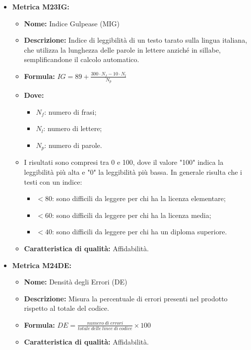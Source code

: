 \begin{itemize}
    \item \hypertarget{item:M23IG}{\textbf{Metrica M23IG:}}
    \begin{minipage}[t]{0.9\textwidth}
            \begin{itemize}
                \item \textbf{Nome:} Indice Gulpease (MIG)
                \item \textbf{Descrizione:} Indice di leggibilità di un testo tarato sulla lingua italiana, che utilizza la lunghezza delle parole in lettere anziché in sillabe, semplificandone il calcolo automatico.
                \item \textbf{Formula:} $IG = 89 + \frac{300 \cdot N_f - 10 \cdot N_l}{N_p}$
                \item \textbf{Dove:}
                      \begin{itemize}
                          \item $N_f$: numero di frasi;
                          \item $N_l$: numero di lettere;
                          \item $N_p$: numero di parole.
                      \end{itemize}
                \item I risultati sono compresi tra 0 e 100, dove il valore "100" indica la leggibilità più alta e "0" la leggibilità più bassa. In generale risulta che i testi con un indice:
                      \begin{itemize}
                          \item $< 80$: sono difficili da leggere per chi ha la licenza elementare;
                          \item $< 60$: sono difficili da leggere per chi ha la licenza media;
                          \item $< 40$: sono difficili da leggere per chi ha un diploma superiore.
                      \end{itemize}
                \item \textbf{Caratteristica di qualità:} Affidabilità.
            \end{itemize}
        \end{minipage}

        \item \hypertarget{item:M23IG}{\textbf{Metrica M24DE:}}
        \begin{minipage}[t]{0.9\textwidth}
                  \begin{itemize}
                      \item \textbf{Nome:} Densità degli Errori (DE)
                      \item \textbf{Descrizione:} Misura la percentuale di errori presenti nel prodotto rispetto al totale del codice.
                      \item \textbf{Formula:} $DE = \frac{numero \ di \ errori}{totale \ delle \ linee \ di \ codice} \times 100$
                      \item \textbf{Caratteristica di qualità:} Affidabilità.
                  \end{itemize}
                \end{minipage}



\end{itemize}
